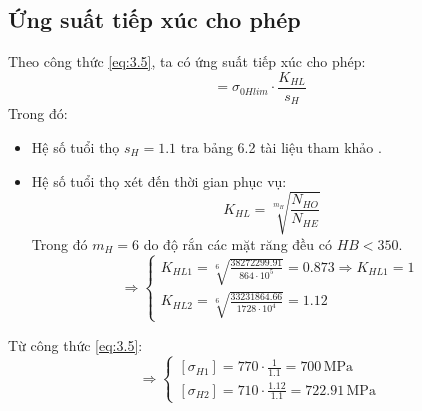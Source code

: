             \subsection{Ứng suất tiếp xúc cho phép}
                \hspace*{0.6cm}Theo công thức \ref{eq:3.5}, ta có ứng suất tiếp xúc cho phép:
                \begin{equation*}
                    [\sigma_{H}] = \sigma_{0Hlim} \cdot \frac{K_{HL}}{s_{H}}
                \end{equation*} 
                \hspace*{0.6cm}Trong đó:
                \begin{itemize}
                    \item Hệ số tuổi thọ $s_H = 1.1$ tra bảng 6.2 tài liệu tham khảo \cite{gtctm}.\\[0.2cm]
                    \item Hệ số tuổi thọ xét đến thời gian phục vụ:
                        \begin{equation*}
                            K_{HL} = \sqrt[m_H]{\frac{N_{HO}}{N_{HE}}}
                        \end{equation*}
                        Trong đó $m_H = 6$ do độ rắn các mặt răng đều có $HB < 350$.\\[0.2cm]
                        \[ 
                        \Rightarrow
                        \begin{cases}
                            K_{HL1} = \sqrt[6]{\frac{38272299.91}{864 \cdot 10^5}} = 0.873 \Rightarrow K_{HL1} = 1 \\
                            K_{HL2} = \sqrt[6]{\frac{33231864.66}{1728 \cdot 10^4}} = 1.12
                        \end{cases}
                        \
                        \]
                \end{itemize}
                \hspace*{0.6cm}Từ công thức \ref{eq:3.5}:
                \[
                \Rightarrow
                \begin{cases}
                    [\sigma_{H1}] = 770 \cdot \frac{1}{1.1} = 700 \, \mathrm{MPa} \\
                    [\sigma_{H2}] = 710 \cdot \frac{1.12}{1.1} = 722.91 \, \mathrm{MPa}
                \end{cases}
                \] 
